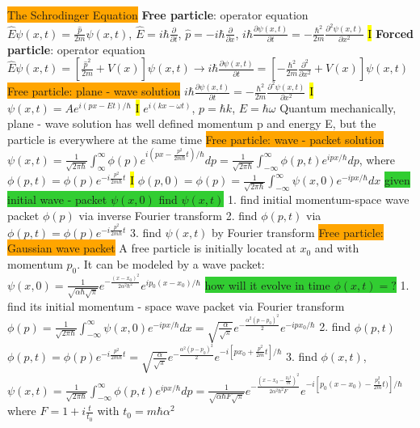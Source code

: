 \documentclass[fontsize=4pt]{scrartcl}
\begin{document}
\colorbox{Orange}{The Schrodinger Equation}
\textbf{Free particle}: operator equation $\hat{E}\psi(x,t) = \frac{\hat{p}}{2m}\psi(x,t)$, $\hat{E}=i\hbar \frac{\partial}{\partial t}$, $\hat{p} = -i\hbar \frac{\partial}{\partial x}$, $i\hbar \frac{\partial \psi(x,t)}{\partial t} = -\frac{\hbar^2}{2m}\frac{\partial^2 \psi (x,t)}{\partial x^2}$
\hl{I}
\textbf{Forced particle}: operator equation $\hat{E}\psi (x,t) = [\frac{\hat{p}^2}{2m}+V(x)]\psi(x,t) \rightarrow i\hbar \frac{\partial \psi (x,t)}{\partial t} = [-\frac{\hbar^2}{2m}\frac{\partial^2}{\partial x^2}+V(x)]\psi(x,t)$
\colorbox{Orange}{Free particle: plane - wave solution}
$i\hbar \frac{\partial \psi(x,t)}{\partial t} = -\frac{\hbar^2}{2m}\frac{\partial^2 \psi (x,t)}{\partial x^2}$
\hl{I} 
$\psi(x,t) = Ae^{i(px - Et)/\hbar}$
\hl{I}
$e^{i(kx-\omega t)}$, $p=\hbar k$, $E = \hbar \omega$
Quantum mechanically, plane - wave solution has well defined momentum p and energy E, but the particle is everywhere at the same time
\colorbox{Orange}{Free particle: wave - packet solution}
$\psi(x,t) = \frac{1}{\sqrt{2\pi \hbar}} \int_{\infty}^{\infty} \phi (p) e^{i(px - \frac{p^2}{2m\hbar}t)/\hbar}dp = \frac{1}{\sqrt{2\pi \hbar}} \int_{-\infty}^{\infty}\phi(p,t)e^{ipx/\hbar} dp$, where $\phi (p,t) = \phi (p) e^{-i\frac{p^2}{2m\hbar}t}$
\hl{I}
$\phi(p,0) = \phi(p) = \frac{1}{\sqrt{2 \pi \hbar}}\int_{-\infty}^{\infty}\psi (x,0) e^{-ipx / \hbar} dx$
\colorbox{LimeGreen}{given initial wave - packet $\psi(x,0)$ find $\psi(x,t)$}
1. find initial momentum-space wave packet $\phi(p)$ via inverse Fourier transform
2. find $\phi(p,t)$ via $\phi(p,t) = \phi(p)e^{-i\frac{p^2}{2m\hbar}t}$
3. find $\psi(x,t)$ by Fourier transform
\colorbox{Orange}{Free particle: Gaussian wave packet}
A free particle is initially located at $x_0$ and with momentum $p_0$. It can be modeled by a wave packet:
$\psi(x,0)=\frac{1}{\sqrt{\alpha \hbar \sqrt{\pi}}}e^{-\frac{(x-x_0)^2}{2\alpha^2 \hbar^2}}e^{ip_0 (x-x_0)/\hbar}$
\colorbox{LimeGreen}{how will it evolve in time $\phi(x,t) = ?$}
1. find its initial momentum - space wave packet via Fourier transform
$\phi(p) = \frac{1}{\sqrt{2\pi \hbar}} \int_{-\infty}^{\infty}\psi(x,0)e^{-ipx/\hbar}dx = \sqrt{\frac{\alpha}{\sqrt{\pi}}}e^{-\frac{\alpha^2(p-p_0)^2}{2}}e^{-ipx_0 / \hbar}$
2. find $\phi(p,t)$
$\phi(p,t) = \phi(p)e^{-i\frac{p^2}{2m\hbar}t} = \sqrt{\frac{\alpha}{\sqrt{\pi}}}e^{-\frac{\alpha^2(p-p_0)^2}{2}} e^{-i[px_0 + \frac{p^2}{2m}t]/ \hbar}$
3. find $\phi(x,t)$,
$\psi(x,t) = \frac{1}{\sqrt{2\pi \hbar}} \int_{-\infty}^{\infty}\phi(p,t)e^{ipx/\hbar}dp = \frac{1}{\sqrt{\alpha \hbar F \sqrt{\pi}}}e^{-\frac{(x-x_0-\frac{p_0 t}{m})^2}{2\alpha^2 \hbar^2 F}} e^{-i [p_0(x-x_0) - \frac{p_0^2}{2m}t)]/\hbar}$ where $F = 1 + i\frac{t}{t_0}$ with $ t_0 = m\hbar \alpha^2$
\end{document}
